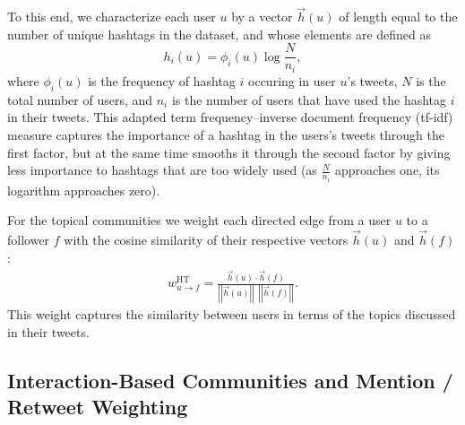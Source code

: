 To this end, we characterize each user $u$ by a vector $\vec{h}(u)$ of length equal to the number of unique hashtags in the dataset, and whose elements are defined as
\begin{equation}
h_i(u) = \phi_i(u)\log{ \frac{N}{n_i} },
\end{equation}
where $\phi_i(u)$ is the frequency of hashtag $i$ occuring in user $u$'s tweets, $N$ is the total number of users, and $n_i$ is the number of users that have used the hashtag $i$ in their tweets. This adapted term frequency--inverse document frequency (tf-idf) measure \cite{salton_introduction_1983} captures the importance of a hashtag in the users's tweets through the first factor, but at the same time smooths it through the second factor by giving less importance to hashtags that are too widely used (as $\frac{N}{n_i}$ approaches one, its logarithm approaches zero). 

For the topical communities we weight each directed edge from a user $u$ to a follower $f$ with the cosine similarity of their respective vectors $\vec{h}(u)$ and $\vec{h}(f)$:
\begin{align}
	w_{u \to f}^{\text{HT}} = \frac{\vec{h}(u) \cdot \vec{h}(f)}{\left|\left|\vec{h}(u)\right|\right| \ \ \left|\left|\vec{h}(f)\right|\right|}. \label{Eqn-EW-topic}
\end{align}
This weight captures the similarity between users in terms of the topics discussed in their tweets. 


\subsection{Interaction-Based Communities and Mention / Retweet Weighting}
\label{sec:method-interaction}

